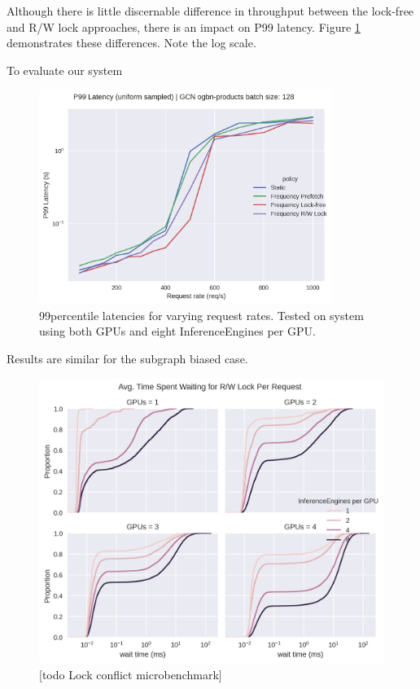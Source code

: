 Although there is little discernable difference in throughput between the lock-free and R/W lock approaches, there is an impact on P99 latency. Figure \ref{Eval: P99 latency} demonstrates these differences.
Note the log scale.

    

To evaluate our system
\begin{figure}[h!]
    \centering
    \includegraphics[width=0.85\textwidth]{figures/P99_latency_GCN_uniform_pinnedc0.2_gpus_3.png}    
    \caption{99\th percentile latencies for varying request rates. Tested on system using both GPUs and eight InferenceEngines per GPU.}
    \label{Eval: P99 latency}
\end{figure}  
Results are similar for the subgraph biased case.

\begin{figure}[h!]
    \centering
    \includegraphics[width=\textwidth]{figures/Lock_Conflicts.png}
    
    \caption{[todo Lock conflict microbenchmark]}
    \label{Eval: Lock conflict microbenchmark}
\end{figure}    






